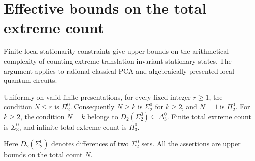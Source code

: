 \section{Effective bounds on the total extreme count}\label{sec:counts}

Finite local stationarity constraints give upper bounds on the
arithmetical complexity of counting extreme translation-invariant stationary states.
The argument applies to rational classical PCA and algebraically
presented local quantum circuits.

\begin{theorem}\label{thm:counts}
Uniformly on valid finite presentations, for every fixed integer
\(r\ge1\), the condition \(N\le r\) is \(\Pi^0_2\).
Consequently \(N\ge k\) is \(\Sigma^0_2\) for \(k\ge2\), and
\(N=1\) is \(\Pi^0_2\).  For \(k\ge2\), the condition \(N=k\)
belongs to \(D_2(\Sigma^0_2)\subseteq\Delta^0_3\).
Finite total extreme count is \(\Sigma^0_3\), and infinite total
extreme count is \(\Pi^0_3\).
\end{theorem}

Here \(D_2(\Sigma^0_2)\) denotes differences of two
\(\Sigma^0_2\) sets.  All the assertions are upper bounds on the
total count \(N\).

